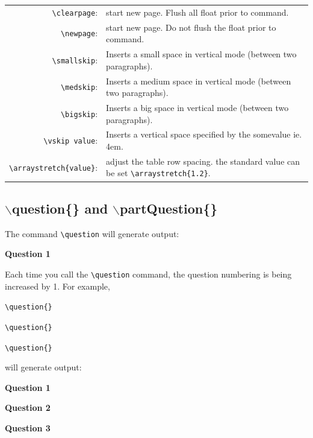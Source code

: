 \documentclass[12pt]{article}
\begin{document}
\begin{table}[H]
	\begin{tabularx}{\linewidth}{r X}		
		\verb|\clearpage|: & start new page. Flush all float prior to command. \\
		
		\verb|\newpage|: & start new page. Do not flush the float prior to command.\\
		
		\verb|\smallskip|: & Inserts a small space in vertical mode (between two paragraphs).\\
		
		\verb|\medskip|: & Inserts a medium space in vertical mode (between two paragraphs).\\
		
		\verb|\bigskip|: & Inserts a big space in vertical mode (between two paragraphs).\\
		
		\verb|\vskip value|: & Inserts a vertical space specified by the somevalue ie. 4em. \\
		\verb|\arraystretch{value}|: & adjust the table row spacing. the standard value can be set \verb|\arraystretch{1.2}|.  
	\end{tabularx}
\end{table}

\subsection{$\backslash$question\{\} and $\backslash$partQuestion\{\}}
The command \verb|\question| will generate output:

\begin{framed}
	\textbf{Question 1\\
		}
\end{framed}


Each time you call the \verb|\question| command, the question numbering is being increased by 1. For example, \bigskip

\verb|\question{}|

\verb|\question{}|

\verb|\question{}|\bigskip

will generate output:

\begin{framed}
	\textbf{
		Question 1\\
	}
	
	\medskip
	\textbf{
		Question 2\\
	}
	
	\medskip
	\textbf{
		Question 3\\
	}
	
\end{framed}
\end{document}
